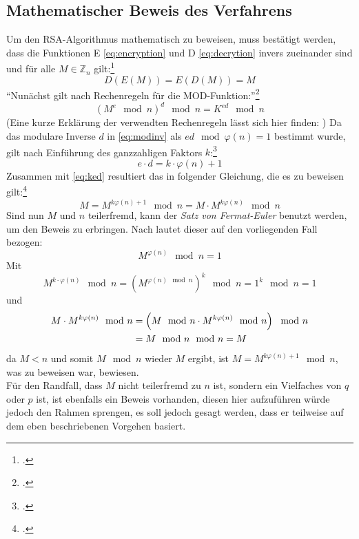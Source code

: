 \documentclass{scrarticle} %
\begin{document}
    \subsection{Mathematischer Beweis des Verfahrens}
        Um den RSA-Algorithmus mathematisch zu beweisen, muss bestätigt werden, dass die Funktionen E \ref{eq:encryption} und D \ref{eq:decrytion} invers zueinander sind und für alle $M\in\mathbb{Z}_n$ gilt:\footcite[Vgl.][78]{ertel2003}
        \begin{equation}
            D(E(M)) = E(D(M)) = M
        \end{equation}
        \enquote{Nunächst gilt nach Rechenregeln für die MOD-Funktion:}\footcite[282]{dankmeier2006}
        \begin{equation}
            \left(M^{e}\mod{n}\right)^{d}\mod{n} = K^{ed}\mod{n} \label{eq:ked}
        \end{equation}
        (Eine kurze Erklärung der verwendten Rechenregeln lässt sich hier finden: \cite{modpot})
        Da das modulare Inverse $d$ in \ref{eq:modinv} als $ed\mod{\varphi(n)}=1$ bestimmt wurde, gilt nach Einführung des ganzzahligen Faktors $k$:\footcite[Vgl.][72]{watjen2008}
        \begin{equation}
            e\cdot d = k\cdot \varphi(n)+1
        \end{equation}
        Zusammen mit \ref{eq:ked} resultiert das in folgender Gleichung, die es zu beweisen gilt:\footcite[Vgl.][282]{dankmeier2006}
        \begin{equation}
           M = M^{k\varphi(n)+1}\mod{n} = M\cdot M^{k\varphi(n)}\mod{n}
        \end{equation}
        Sind nun $M$ und $n$ teilerfremd, kann der \emph{Satz von Fermat-Euler} benutzt werden, um den Beweis zu erbringen. Nach \cite[390]{bronstejn2016} lautet dieser auf den vorliegenden Fall bezogen:
        \begin{equation}
            M^{\varphi(n)} \mod{n} = 1
        \end{equation}
        Mit
        \begin{equation}
            M^{k \cdot \varphi(n)} \mod{n} = \left(M^{\varphi(n)\mod{n}}\right)^{k} \mod{n} = 1^{k}\mod{n} = 1
        \end{equation}
        und
        \begin{align}
            M\cdot M^{k\varphi(n)}\mod{n} &= \left(M\mod{n}\cdot M^{k\varphi(n)}\mod{n}\right)\mod{n}\\
             &= M\mod{n}\mod{n} = M \notag
        \end{align}
        da $M < n$ und somit $M\mod{n}$ wieder $M$ ergibt,
        ist $M = M^{k\varphi(n)+1}\mod{n}$, was zu beweisen war, bewiesen.\\
        Für den Randfall, dass $M$ nicht teilerfremd zu $n$ ist, sondern ein Vielfaches von $q$ oder $p$ ist, ist ebenfalls ein Beweis vorhanden, diesen hier aufzuführen würde jedoch den Rahmen sprengen, es soll jedoch gesagt werden, dass er teilweise auf dem eben beschriebenen Vorgehen basiert.
        
\end{document}
